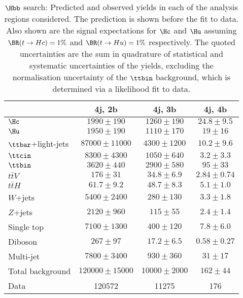 \begin{table}[htbp]
\caption{
$\Hbb$ search: Predicted and observed yields in each of the analysis regions considered.
The prediction is shown before the fit to data. Also shown are the signal expectations for 
$\Hc$ and $\Hu$ assuming $\BR(t\to Hc)=1\%$ and $\BR(t\to Hu)=1\%$ respectively.
The quoted uncertainties are the sum in quadrature of statistical and systematic uncertainties of the yields, 
excluding the normalisation uncertainty of the $\ttbin$ background, which is determined via a likelihood fit to data.
}
\small
\begin{center}
\begin{tabular}{l*{3}{c}}
\hline\hline
 & 4j, 2b & 4j, 3b & 4j, 4b \\
\hline
$\Hc$ & $ 1990 \pm 190 $ &   $ 1260 \pm 190 $ &   $ 24.8 \pm 9.5 $ \\
$\Hu$ & $ 1950 \pm 190 $ &   $ 1110 \pm 170 $ &   $ 19 \pm 16 $ \\ 
\hline
$\ttbar$+light-jets & $ 87000 \pm 11000 $ &   $ 4300 \pm 1200 $ &   $ 10.2 \pm 9.6 $ \\ 
$\ttcin$ & $ 8300 \pm 4300 $ &   $ 1050 \pm 640 $ &   $ 3.2 \pm 3.3 $ \\ 
$\ttbin$ & $ 3620 \pm 440 $ &   $ 2900 \pm 580 $ &   $ 95 \pm 33 $ \\ 
$t\bar{t}V$ & $ 176 \pm 31 $ &   $ 34.8 \pm 6.9 $ &   $ 2.84 \pm 0.74 $ \\ 
$t\bar{t}H$ & $ 61.7 \pm 9.2 $ &   $ 48.7 \pm 8.3 $ &   $ 5.1 \pm 1.0 $ \\
$W$+jets & $ 5400 \pm 2400 $ &   $ 280 \pm 130 $ &   $ 3.3 \pm 1.8 $ \\ 
$Z$+jets & $ 2120 \pm 960 $ &   $ 115 \pm 55 $ &   $ 2.4 \pm 1.4 $ \\ 
Single top & $ 7100 \pm 1300 $ &   $ 400 \pm 120 $ &   $ 7.8 \pm 6.0 $ \\ 
Diboson & $ 267 \pm 97 $ &   $ 17.2 \pm 6.5 $ &   $ 0.58 \pm 0.27 $ \\ 
Multi-jet & $ 7800 \pm 3400 $ &   $ 930 \pm 360 $ &   $ 31 \pm 17 $ \\
\hline
Total background & $ 120000 \pm 15000 $ &   $ 10000 \pm 2000 $ &   $ 162 \pm 44 $ \\ 
\hline
Data & 120572  & 11275  & 176  \\
\hline\hline    
\end{tabular}
\vspace{0.2cm}


\end{center}
\end{table}
